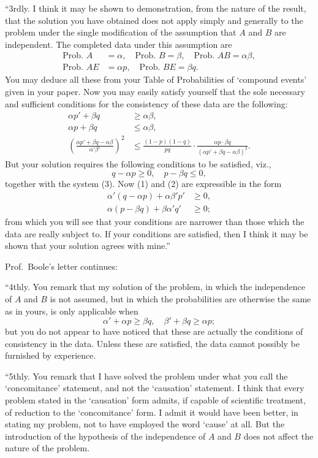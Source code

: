 \documentclass[11pt,a4paper]{article}
\theoremstyle{plain}
\begin{document}
``3rdly. I think it may be shown to demonstration, from the nature of the result, that the solution you have obtained does not apply simply and generally to the problem under the single modification of the assumption that $A$ and $B$ are independent. The completed data under this assumption are
\begin{align*}
\text{Prob.\ } A &= \alpha, \quad \text{Prob.\ } B = \beta, \quad \text{Prob.\ } AB = \alpha\beta, \\
\text{Prob.\ } AE &= \alpha p, \quad \text{Prob.\ } BE = \beta q.
\end{align*}
You may deduce all these from your Table of Probabilities of `compound events' given in your paper. Now you may easily satisfy yourself that the sole necessary and sufficient conditions for the consistency of these data are the following:
\begin{align}
\alpha p' + \beta q &\geq \alpha\beta, \\
\alpha p + \beta q &\leq \alpha\beta, \\
\left(\frac{\alpha p' + \beta q - \alpha\beta}{\alpha' \beta'}\right)^2 &\leq \frac{(1-p)(1-q)}{pq} \cdot \frac{\alpha p \cdot \beta q}{(\alpha p' + \beta q - \alpha\beta)^2}. \tag{M}
\end{align}
But your solution requires the following conditions to be satisfied, viz.,
\[
q - \alpha p \geq 0, \quad p - \beta q \leq 0,
\]
together with the system (3). Now (1) and (2) are expressible in the form
\begin{align*}
\alpha'(q - \alpha p) + \alpha\beta' p' &\geq 0, \\
\alpha(p - \beta q) + \beta\alpha' q' &\geq 0;
\end{align*}
from which you will see that your conditions are narrower than those which the data are really subject to. If your conditions are satisfied, then I think it may be shown that your solution agrees with mine.''

\newpage
Prof.\ Boole's letter continues:

``4thly. You remark that my solution of the problem, in which the independence of $A$ and $B$ is not assumed, but in which the probabilities are otherwise the same as in yours, is only applicable when
\[
\alpha' + \alpha p \geq \beta q, \quad \beta' + \beta q \geq \alpha p;
\]
but you do not appear to have noticed that these are actually the conditions of consistency in the data. Unless these are satisfied, the data cannot possibly be furnished by experience.

``5thly. You remark that I have solved the problem under what you call the `concomitance' statement, and not the `causation' statement. I think that every problem stated in the `causation' form admits, if capable of scientific treatment, of reduction to the `concomitance' form. I admit it would have been better, in stating my problem, not to have employed the word `cause' at all. But the introduction of the hypothesis of the independence of $A$ and $B$ does not affect the nature of the problem.
\end{document}
